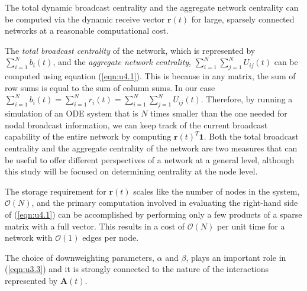 \begin{highlightedParagraphC}
 
The total dynamic broadcast centrality and the aggregate network centrality can be computed via the dynamic receive vector $\mathbf{r}(t)$ for large, sparsely connected networks at a reasonable computational cost.

\end{highlightedParagraphC}

The \textit{total broadcast centrality} of the network, which is represented by $\sum_{i=1}^{N} b_i(t)$, and the \textit{aggregate network centrality}, $\sum_{i=1}^{N}\sum_{j=1}^{N} U_{ij}(t)$ can be computed using equation (\ref{eqn:u4.1}). This is because in any matrix, the sum of row sums is equal to the sum of column sums. In our case $\sum_{i=1}^{N} b_i(t) = \sum_{i=1}^{N} r_i(t)=\sum_{i=1}^{N}\sum_{j=1}^{N} U_{ij}(t)$. Therefore, by running a simulation of an ODE system that is $N$ times smaller than the one needed for nodal broadcast information, we can keep track of the current broadcast capability of the entire network by computing $\mathbf{r}(t)^T\mathbf{1}$. Both the total broadcast centrality and the aggregate centrality of the network are two measures that can be useful to offer different perspectives of a network at a general level, although this study will be focused on determining centrality at the node level.

The storage requirement for $\mathbf{r}(t)$ scales like the number of nodes in the system, $\mathcal{O}(N)$, and the primary computation involved in evaluating the right-hand side of (\ref{eqn:u4.1}) can be accomplished by performing only a few products of a sparse matrix with a full vector. This results in a cost of $\mathcal{O}(N)$ per unit time for a network with $\mathcal{O}(1)$ edges per node.

\begin{highlightedParagraphC}
 
The choice of downweighting parameters, $\alpha$ and $\beta$, plays an important role in (\ref{eqn:u3.3}) and it is strongly connected to the nature of the interactions represented by $\mathbf{A}(t)$.

\end{highlightedParagraphC}

